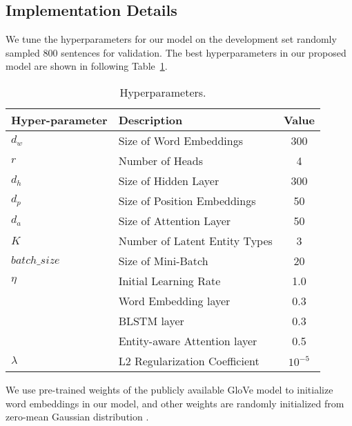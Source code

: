 \documentclass[twoside,leqno,twocolumn]{article}
\begin{document}
\subsection{Implementation Details}
We tune the hyperparameters for our model on the development set randomly sampled 800 sentences for validation.
The best hyperparameters in our proposed model are shown in following Table~\ref{tb:1}.
\begin{table}[!ht]
\begin{center}
\renewcommand{\arraystretch}{1.1}
\begin{tabular}{>{\centering\arraybackslash}m{1.8cm} l c}
Hyper-parameter & Description & Value \\ 
\hline\hline
$d_w$ & Size of Word Embeddings & 300 \\ \hline
$r$ & Number of Heads & 4 \\ \hline
$d_h$ & Size of Hidden Layer & 300 \\ \hline
$d_p$ & Size of Position Embeddings & 50 \\ \hline
$d_a$ & Size of Attention Layer & 50 \\ \hline
$K$ & Number of Latent Entity Types & 3 \\ \hline
$batch\_size$ & Size of Mini-Batch & 20 \\ \hline
$\eta$ & Initial Learning Rate & 1.0 \\ \hline
\multirow{3}{1.8cm}{\textit{dropout rate}\centering}
& Word Embedding layer & 0.3 \\
& BLSTM layer& 0.3 \\
& Entity-aware Attention layer & 0.5 \\ \hline
$\lambda$ & L2 Regularization Coefficient & $10^{-5}$ \\ \hline
\end{tabular}
\end{center}
\caption{Hyperparameters.}
\label{tb:1}
\end{table}

We use pre-trained weights of the publicly available GloVe model \cite{pennington2014glove} to initialize word embeddings in our model, and other weights are randomly initialized from zero-mean Gaussian distribution \cite{glorot2010understanding}.
\end{document}
